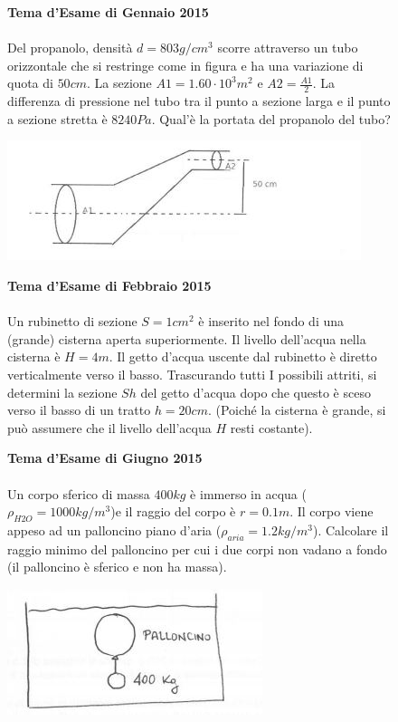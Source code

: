 \begin{figure}[h!]
\textbf{Tema d'Esame di Gennaio 2015}\\ \\
Del propanolo, densità $d=803 g/cm^3$ scorre attraverso un tubo orizzontale che si restringe come in figura e ha una variazione di quota di $50cm$. La sezione $A1=1.60\cdot 10^3m^2$ e $A2=\frac{A1}{2}$. La differenza di pressione nel tubo tra il punto a sezione larga e il punto a sezione stretta è $8240Pa$. Qual'è la portata del propanolo del tubo?
\\
	\begin{center}
		\includegraphics[scale=1.1]{ES4/GEN042015.jpg}
	\end{center}
\end{figure}

\begin{figure}[h!]
\textbf{Tema d'Esame di Febbraio 2015}\\ \\
 Un rubinetto di sezione $S = 1 cm^2$
 è inserito nel fondo di una (grande) cisterna aperta
superiormente. Il livello dell'acqua nella cisterna è $H = 4 m$. Il getto d'acqua uscente dal
rubinetto è diretto verticalmente verso il basso. Trascurando tutti I possibili attriti, si
determini la sezione $Sh$ del getto d'acqua dopo che questo è sceso verso il basso di un tratto
$h = 20 cm$. (Poiché la cisterna è grande, si può assumere che il livello dell'acqua $H$ resti
costante).
\\
\end{figure}

\begin{figure}[h!]
\textbf{Tema d'Esame di Giugno 2015}\\ \\
Un corpo sferico di massa $400kg$ è immerso in acqua ($\rho_{H2O}=1000kg/m^3$)e il raggio del corpo è $r=0.1m$. Il corpo viene appeso ad un palloncino piano d'aria ($\rho_{aria}=1.2kg/m^3$). Calcolare il raggio minimo del palloncino per cui i due corpi non vadano a fondo (il palloncino è sferico e non ha massa).
\\
\begin{center}
		\includegraphics[scale=1.3]{ES4/GIU042015.jpg}
	\end{center}
\end{figure}


